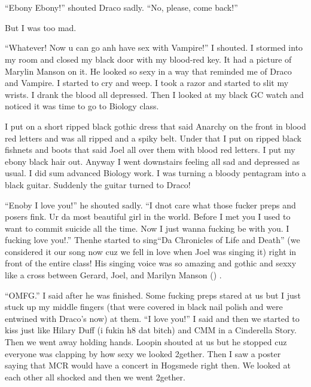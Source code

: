 \section{}



\enquote{Ebony Ebony!} shouted Draco sadly. \enquote{No, please, come back!}

But I was too mad.

\begin{sloppypar}
    \enquote{Whatever! Now u can go anh have sex with Vampire!} I shouted. I stormed into my room and closed my black door with my blood-red key. It had a picture of Marylin Manson on it. He looked so sexy in a way that reminded me of Draco and Vampire. I started to cry and weep. I took a razor and started to slit my wrists. I drank the blood all depressed. Then I looked at my black GC watch and noticed it was time to go to Biology class.    
\end{sloppypar}

I put on a short ripped black gothic dress that said Anarchy on the front in blood red letters and was all ripped and a spiky belt. Under that I put on ripped black fishnets and boots that said Joel all over them with blood red letters. I put my ebony black hair out. Anyway I went downstairs feeling all sad and depressed as usual. I did sum advanced Biology work. I was turning a bloody pentagram into a black guitar. Suddenly the guitar turned to Draco!

\enquote{Enoby I love you!} he shouted sadly. \enquote{I dnot care what those fucker preps and posers fink. Ur da most beautiful girl in the world. Before I met you I used to want to commit suicide all the time. Now I just wanna fucking be with you. I fucking love you!.} Then\dotfill he started to sing\newline \enquote{Da Chronicles of Life and Death\nocite{GC-chronicles_life_death-selftitle}} (we considered it our song now cuz we fell in love when Joel was singing it) right in front of the entire class! His singing voice was so amazing and gothic and sexxy like a cross between Gerard, Joel,   and Marilyn Manson () .

\enquote{OMFG.} I said after he was finished. Some fucking preps stared at us but I just stuck up my middle fingers (that were covered in black nail polish and were entwined with Draco's now) at them. \enquote{I love you!} I said and then we started to kiss just like Hilary Duff (i fukin h8 dat bitch) and CMM in a Cinderella Story. Then we went away holding hands. Loopin shouted at us but he stopped cuz everyone was clapping by how sexy we looked 2gether. Then I saw a poster saying that MCR would have a concert in Hogsmede right then. We looked at each other all shocked and then we went 2gether.
